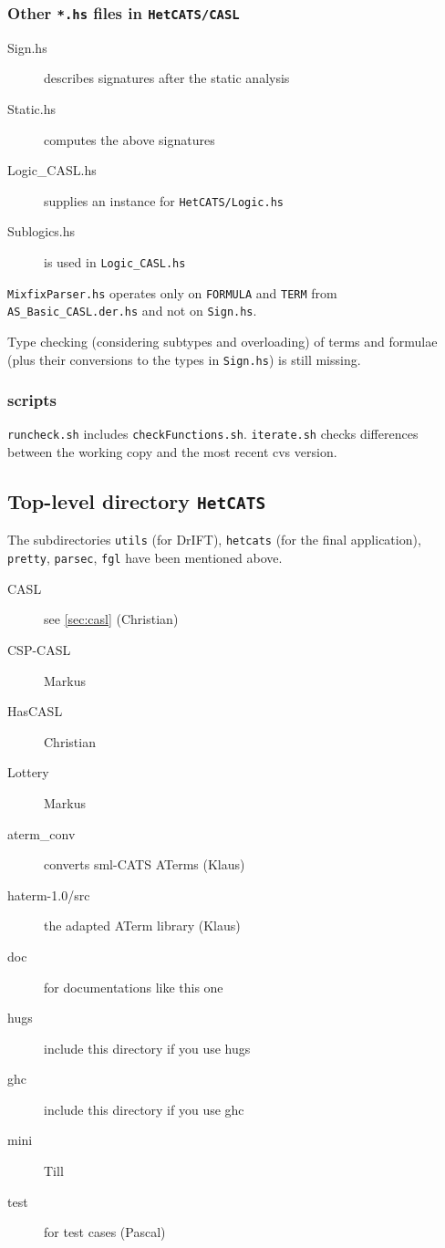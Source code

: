 \documentclass{article}
\begin{document}
\subsubsection*{Other \texttt{*.hs} files in \texttt{HetCATS/CASL}}

\begin{description}
\item[Sign.hs] describes signatures after the static analysis
\item[Static.hs] computes the above signatures
\item[Logic\_CASL.hs] supplies an instance for \texttt{HetCATS/Logic.hs}
\item[Sublogics.hs] is used in \texttt{Logic\_CASL.hs}
\end{description}
 
\texttt{MixfixParser.hs} operates only on \texttt{FORMULA} and
\texttt{TERM} from \texttt{AS\_Basic\_CASL.der.hs} and not on
\texttt{Sign.hs}. 

Type checking (considering subtypes and overloading) of terms and
formulae (plus their conversions to the types in \texttt{Sign.hs}) is
still missing.

\subsubsection*{scripts}

\texttt{runcheck.sh} includes \texttt{checkFunctions.sh}.
\texttt{iterate.sh} checks differences between the working copy and
the most recent cvs version.


\subsection{Top-level directory \texttt{HetCATS}}

The subdirectories \texttt{utils} (for DrIFT), \texttt{hetcats} (for
the final application), \texttt{pretty}, \texttt{parsec}, \texttt{fgl}
have been mentioned above.

\begin{description}
\item[CASL] see \ref{sec:casl} (Christian)
\item[CSP-CASL] Markus
\item[HasCASL] Christian
\item[Lottery] Markus
\item[aterm\_conv] converts sml-CATS ATerms (Klaus)
\item[haterm-1.0/src] the adapted ATerm library (Klaus)
\item[doc] for documentations like this one
\item[hugs] include this directory if you use hugs
\item[ghc] include this directory if you use ghc
\item[mini] Till
\item[test] for test cases (Pascal)
\end{description}
\end{document}

